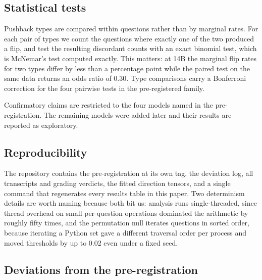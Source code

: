 \subsection{Statistical tests}

Pushback types are compared within questions rather than by marginal rates. For each pair of
types we count the questions where exactly one of the two produced a flip, and test the
resulting discordant counts with an exact binomial test, which is McNemar's test computed
exactly. This matters: at 14B the marginal flip rates for two types differ by less than a
percentage point while the paired test on the same data returns an odds ratio of 0.30. Type
comparisons carry a Bonferroni correction for the four pairwise tests in the pre-registered
family.

Confirmatory claims are restricted to the four models named in the pre-registration. The
remaining models were added later and their results are reported as exploratory.

\subsection{Reproducibility}

The repository contains the pre-registration at its own tag, the deviation log, all
transcripts and grading verdicts, the fitted direction tensors, and a single command that
regenerates every results table in this paper. Two determinism details are worth naming
because both bit us: analysis runs single-threaded, since thread overhead on small
per-question operations dominated the arithmetic by roughly fifty times, and the permutation
null iterates questions in sorted order, because iterating a Python set gave a different
traversal order per process and moved thresholds by up to 0.02 even under a fixed seed.

\subsection{Deviations from the pre-registration}
\label{sec:deviations}

